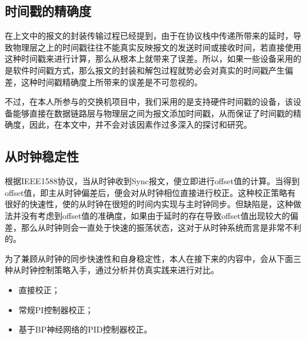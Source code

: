 \subsection{时间戳的精确度}
\label{sec:1588_problem_2}
在上文中的报文的封装传输过程已经提到，由于在协议栈中传递所带来的延时，导致物理层之上的时间戳往往不能真实反映报文的发送时间或接收时间，若直接使用这种时间戳来进行计算，那么从根本上就带来了误差\supercite{53}。所以，如果一些设备采用的是软件时间戳方式，那么报文的封装和解包过程就势必会对真实的时间戳产生偏差，这种时间戳精确度上所带来的误差是不可忽视的。

不过，在本人所参与的交换机项目中，我们采用的是支持硬件时间戳的设备，该设备能够直接在数据链路层与物理层之间为报文添加时间戳，从而保证了时间戳的精确度，因此，在本文中，并不会对该因素作过多深入的探讨和研究。

\subsection{从时钟稳定性}
\label{sec:1588_problem_3}
根据IEEE1588协议，当从时钟收到Sync报文，便立即进行offset值的计算。当得到offset值，即主从时钟偏差后，便会对从时钟相位直接进行校正。这种校正策略有很好的快速性，使的从时钟在很短的时间内实现与主时钟同步。但缺陷是，这种做法并没有考虑到offset值的准确度，如果由于延时的存在导致offset值出现较大的偏差，那么从时钟则会一直处于快速的振荡状态，这对于从时钟系统而言是非常不利的。

为了兼顾从时钟的同步快速性和自身稳定性，本人在接下来的内容中，会从下面三种从时钟控制策略入手，通过分析并仿真实践来进行对比。
\begin{itemize}[noitemsep,topsep=0pt,parsep=0pt,partopsep=0pt]
	\item 直接校正；
	\item 常规PI控制器校正；
	\item 基于BP神经网络的PID控制器校正。
\end{itemize}




